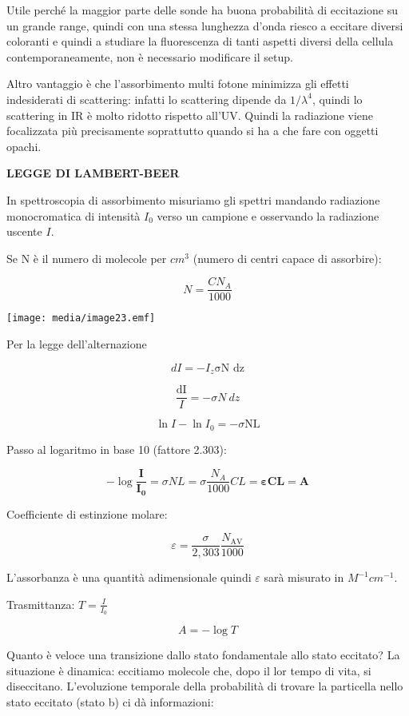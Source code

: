 Utile perché la maggior parte delle sonde ha buona probabilità di
eccitazione su un grande range, quindi con una stessa lunghezza d'onda
riesco a eccitare diversi coloranti e quindi a studiare la fluorescenza
di tanti aspetti diversi della cellula contemporaneamente, non è
necessario modificare il setup.

Altro vantaggio è che l'assorbimento multi fotone minimizza gli effetti
indesiderati di scattering: infatti lo scattering dipende da
\(1/\lambda^{4}\), quindi lo scattering in IR è molto ridotto rispetto
all'UV. Quindi la radiazione viene focalizzata più precisamente
soprattutto quando si ha a che fare con oggetti opachi.

\textbf{LEGGE DI LAMBERT-BEER}

In spettroscopia di assorbimento misuriamo gli spettri mandando
radiazione monocromatica di intensità \(I_{0}\) verso un campione e
osservando la radiazione uscente \(I\).

Se N è il numero di molecole per \(cm^{3}\) (numero di centri capace di
assorbire):

\[N = \frac{CN_{A}}{1000}\]

\texttt{[image: media/image23.emf]}

Per la legge dell'alternazione

\[dI = - I_{z}\text{σN\ dz}\]

\[\frac{\text{dI}}{I} = - \sigma N\ dz\]

\[\ln{I - \ln I_{0} = - \sigma}\text{NL}\]

Passo al logaritmo in base 10 (fattore 2.303):

\[\mathbf{-}\log\frac{\mathbf{I}}{\mathbf{I}_{\mathbf{0}}}\mathbf{=}\sigma NL = \sigma\frac{N_{A}}{1000}CL = \mathbf{\varepsilon CL = A}\]

Coefficiente di estinzione molare:

\[\varepsilon = \frac{\sigma}{2,303}\frac{N_{\text{AV}}}{1000}\]

L'assorbanza è una quantità adimensionale quindi \(\varepsilon\) sarà
misurato in \(M^{- 1}cm^{- 1}\).

Trasmittanza: \(T = \frac{I}{I_{0}}\)

\[A = - \log T\]

Quanto è veloce una transizione dallo stato fondamentale allo stato
eccitato? La situazione è dinamica: eccitiamo molecole che, dopo il lor
tempo di vita, si diseccitano. L'evoluzione temporale della probabilità
di trovare la particella nello stato eccitato (stato b) ci dà
informazioni:

